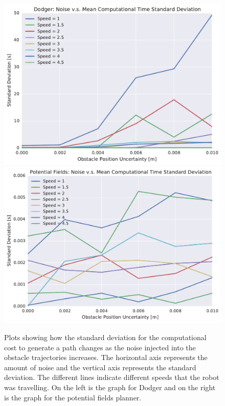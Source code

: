 \begin{figure}[h!]
    \centering

    \includegraphics[width=0.48\linewidth]{figs/planner_std_avg_times_2}
    \includegraphics[width=0.48\linewidth]{figs/pf_std_avg_times_2}

    \caption{Plots showing how the standard deviation for the computational
        cost to generate a path changes as the noise injected into the obstacle
        trajectories increases.  The horizontal axis represents the amount of
        noise and the vertical axis represents the standard deviation. The
    different lines indicate different speeds that the robot was travelling. On
the left is the graph for Dodger and on the right is the graph for the
potential fields planner.}

\end{figure}



